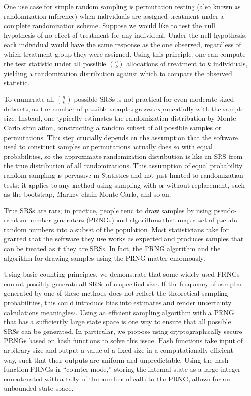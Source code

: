 \documentclass[12pt]{article}
\begin{document}
One use case for simple random sampling is permutation testing (also known as randomization inference) when individuals are assigned treatment under a complete randomization scheme.
Suppose we would like to test the null hypothesis of no effect of treatment for any individual.
Under the null hypothesis, each individual would have the same response as the one observed, regardless of which treatment group they were assigned.
Using this principle, one can compute the test statistic under all possible $n \choose k$ allocations of treatment to $k$ individuals, yielding a randomization distribution against which to compare the observed statistic.

To enumerate all $n \choose k$ possible SRSs is not practical for even moderate-sized datasets, as the number of possible samples grows exponentially with the sample size.
Instead, one typically estimates the randomization distribution by Monte Carlo simulation, constructing a random subset of all possible samples or permutations.
This step crucially depends on the assumption that the software used to construct samples or permutations actually does so with equal probabilities, 
so the approximate randomization distribution is like an SRS from the true distribution of all randomizations.
This assumption of equal probability random sampling is pervasive in Statistics and not just limited to randomization tests:
it applies to any method using sampling with or without replacement, such as the bootstrap, Markov chain Monte Carlo, and so on.

True SRSs are rare; in practice, people tend to draw samples by using pseudo-random number generators 
(PRNGs) and algorithms that map a set of pseudo-random numbers into a subset of the population. 
Most statisticians take for granted that the software they use works as expected and
produces samples that can be treated as if they are SRSs.
In fact, the PRNG algorithm and the algorithm for drawing samples using the PRNG matter enormously.

Using basic counting principles, we demonstrate that some widely used PRNGs cannot possibly generate all SRSs of a specified size.
If the frequency of samples generated by one of these methods does not reflect the theoretical sampling probabilities, this could introduce bias into estimates and render uncertainty calculations meaningless.
Using an efficient sampling algorithm with a PRNG that has a sufficiently large state space is one way to ensure that all possible SRSs can be generated.
In particular, we propose using cryptographically secure PRNGs based on hash functions to solve this issue.
Hash functions take input of arbitrary size and output a value of a fixed size in a computationally efficient way,
such that their outputs are uniform and unpredictable.
Using the hash function PRNGs in ``counter mode,'' storing the internal state as a large integer concatenated with a tally of the number of calls to the PRNG, allows for an unbounded state space.
\end{document}

